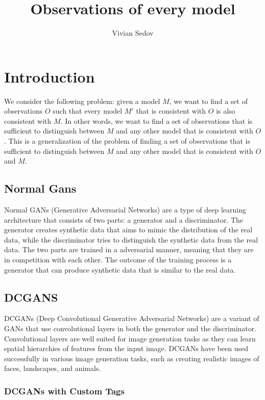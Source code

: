 \documentclass{article}
\title{Observations of every model}
\author{Vivian Sedov}
\theoremstyle{mytheoremstyle}
\theoremstyle{mytheoremstyle}
\theoremstyle{myproblemstyle}
\begin{document}
    \maketitle


    \newpage

    \section{Introduction}
    We consider the following problem: given a model $M$, we want to find a set of observations $O$ such that every model $M'$ that is consistent with $O$ is also consistent with $M$. In other words, we want to find a set of observations that is sufficient to distinguish between $M$ and any other model that is consistent with $O$. This is a generalization of the problem of finding a set of observations that is sufficient to distinguish between $M$ and any other model that is consistent with $O$ and $M$.

    \subsection{Normal Gans}

    Normal GANs (Generative Adversarial Networks) are a type of deep learning architecture that consists of two parts: a generator and a discriminator. The generator creates synthetic data that aims to mimic the distribution of the real data, while the discriminator tries to distinguish the synthetic data from the real data. The two parts are trained in a adversarial manner, meaning that they are in competition with each other. The outcome of the training process is a generator that can produce synthetic data that is similar to the real data.

    \subsection{DCGANS}

    DCGANs (Deep Convolutional Generative Adversarial Networks) are a variant of GANs that use convolutional layers in both the generator and the discriminator. Convolutional layers are well suited for image generation tasks as they can learn spatial hierarchies of features from the input image. DCGANs have been used successfully in various image generation tasks, such as creating realistic images of faces, landscapes, and animals.

    \subsubsection{DCGANs with Custom Tags}
\end{document}
